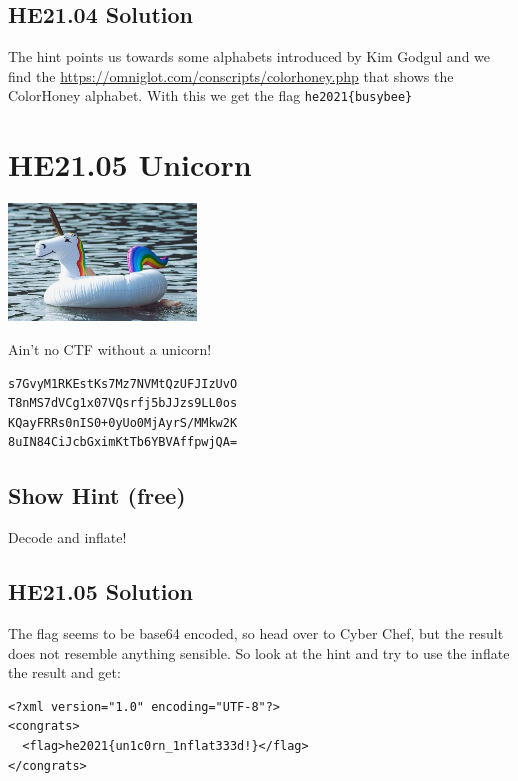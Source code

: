 \documentclass[english,a4paper,nols,noindent]{tufte-handout}
\begin{document}
\hypertarget{he21.04-solution}{%
\subsection{HE21.04 Solution}\label{he21.04-solution}}

\noindent The hint points us towards some alphabets introduced by Kim
Godgul and we find the
\url{https://omniglot.com/conscripts/colorhoney.php} that shows the
ColorHoney alphabet.  With this we get the flag \verb+he2021{busybee}+

\hypertarget{he21.05}{%
\section{HE21.05 Unicorn}\label{he21.05}}
\begin{marginfigure}
    \includegraphics[width=50mm]{images/challenge5.jpg}
\end{marginfigure}

 Ain't no CTF without a unicorn! {\NotoEmoji 🦄}

\begin{verbatim}
s7GvyM1RKEstKs7Mz7NVMtQzUFJIzUvO  
T8nMS7dVCg1x07VQsrfj5bJJzs9LL0os  
KQayFRRs0nIS0+0yUo0MjAyrS/MMkw2K  
8uIN84CiJcbGximKtTb6YBVAffpwjQA=  
\end{verbatim}

\subsection{Show Hint (free)}
Decode and inflate!

\hypertarget{he21.05-solution}{%
\subsection{HE21.05 Solution}\label{he21.05-solution}}

The flag seems to be base64 encoded, so head over to Cyber Chef, but
the result does not resemble anything sensible. So look at the hint
and try to use the inflate the result and get:

\begin{verbatim}
<?xml version="1.0" encoding="UTF-8"?>
<congrats>
  <flag>he2021{un1c0rn_1nflat333d!}</flag>
</congrats>
\end{verbatim}
\end{document}
